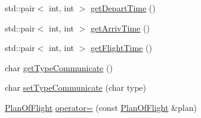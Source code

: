 \begin{DoxyCompactItemize}
\item 
std\+::pair$<$ int, int $>$ \hyperlink{class_plan_of_flight_aec66112d814d5683b0604a707a3088f0}{get\+Depart\+Time} ()
\item 
std\+::pair$<$ int, int $>$ \hyperlink{class_plan_of_flight_affac0e2f1d9bc370b7c7c90fb026f9ae}{get\+Arriv\+Time} ()
\item 
std\+::pair$<$ int, int $>$ \hyperlink{class_plan_of_flight_ab3a817d3a151399645c73959e063368c}{get\+Flight\+Time} ()
\item 
char \hyperlink{class_plan_of_flight_a31870f55b4d81dd0df9971e27144a76c}{get\+Type\+Communicate} ()
\item 
char \hyperlink{class_plan_of_flight_aa169239caa2fe194a0ba9c27673fa2ba}{set\+Type\+Communicate} (char type)
\item 
\hyperlink{class_plan_of_flight}{Plan\+Of\+Flight} \hyperlink{class_plan_of_flight_a25c9fb15b8bf60547999ef6115a86638}{operator=} (const \hyperlink{class_plan_of_flight}{Plan\+Of\+Flight} \&plan)
\end{DoxyCompactItemize}
